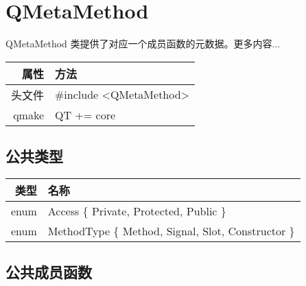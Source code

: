 \chapter{QMetaMethod}

QMetaMethod 类提供了对应一个成员函数的元数据。更多内容...

\begin{tabular}{|r|l|}
	\hline
	属性 & 方法 \\
	\hline
	头文件 & \#include <QMetaMethod>\\      
	\hline
	qmake & QT += core\\      
	\hline
\end{tabular}

\section{公共类型}

\begin{tabular}{|r|l|}   
\hline
类型	& 名称 \\ 
\hline
enum	&Access \{ Private, Protected, Public \} \\ 
\hline
enum	& MethodType \{ Method, Signal, Slot, Constructor \} \\
\hline
\end{tabular}

\section{公共成员函数}


